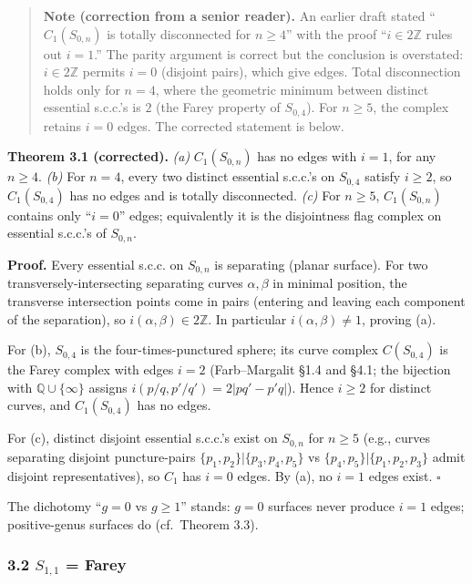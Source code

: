 \documentclass[
]{article}
\begin{document}
\begin{quote}
\textbf{Note (correction from a senior reader).} An earlier draft stated
``\(C_1(S_{0,n})\) is totally disconnected for \(n \ge 4\)'' with the
proof ``\(i \in 2\mathbb Z\) rules out \(i = 1\).'' The parity argument
is correct but the conclusion is overstated: \(i \in 2\mathbb Z\)
permits \(i = 0\) (disjoint pairs), which give edges. Total
disconnection holds only for \(n = 4\), where the geometric minimum
between distinct essential s.c.c.'s is \(2\) (the Farey property of
\(S_{0,4}\)). For \(n \ge 5\), the complex retains \(i = 0\) edges. The
corrected statement is below.
\end{quote}

\textbf{Theorem 3.1 (corrected).} \emph{(a)} \(C_1(S_{0,n})\) has no
edges with \(i = 1\), for any \(n \ge 4\). \emph{(b)} For \(n = 4\),
every two distinct essential s.c.c.'s on \(S_{0,4}\) satisfy
\(i \ge 2\), so \(C_1(S_{0,4})\) has no edges and is totally
disconnected. \emph{(c)} For \(n \ge 5\), \(C_1(S_{0,n})\) contains only
``\(i=0\)'' edges; equivalently it is the disjointness flag complex on
essential s.c.c.'s of \(S_{0,n}\).

\textbf{Proof.} Every essential s.c.c. on \(S_{0,n}\) is separating
(planar surface). For two transversely-intersecting separating curves
\(\alpha, \beta\) in minimal position, the transverse intersection
points come in pairs (entering and leaving each component of the
separation), so \(i(\alpha, \beta) \in 2\mathbb Z\). In particular
\(i(\alpha, \beta) \ne 1\), proving (a).

For (b), \(S_{0,4}\) is the four-times-punctured sphere; its curve
complex \(C(S_{0,4})\) is the Farey complex with edges \(i = 2\)
(Farb--Margalit §1.4 and §4.1; the bijection with
\(\mathbb Q \cup \{\infty\}\) assigns \(i(p/q, p'/q') = 2|pq' - p'q|\)).
Hence \(i \ge 2\) for distinct curves, and \(C_1(S_{0,4})\) has no
edges.

For (c), distinct disjoint essential s.c.c.'s exist on \(S_{0,n}\) for
\(n \ge 5\) (e.g., curves separating disjoint puncture-pairs
\(\{p_1,p_2\} | \{p_3, p_4, p_5\}\) vs
\(\{p_4, p_5\} | \{p_1, p_2, p_3\}\) admit disjoint representatives), so
\(C_1\) has \(i=0\) edges. By (a), no \(i=1\) edges exist. \(\square\)

The dichotomy ``\(g = 0\) vs \(g \ge 1\)'' stands: \(g = 0\) surfaces
never produce \(i = 1\) edges; positive-genus surfaces do (cf.~Theorem
3.3).

\subsubsection{\texorpdfstring{3.2 \(S_{1,1}\) =
Farey}{3.2 S\_\{1,1\} = Farey}}\label{s_11-farey}
\end{document}

